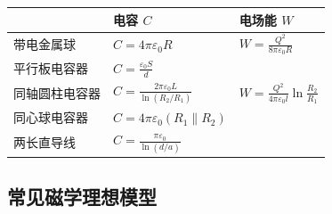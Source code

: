 \documentclass[UTF8,fontset=fandol,zihao=5]{ctexart}
\begin{document}
\begin{center}
\begin{tabularx}{0.96\textwidth}{>{\raggedright\arraybackslash}p{3.8cm}X X}
\toprule
 & 电容 \(C\) & 电场能 \(W\)\\
\midrule
带电金属球 & \(\displaystyle C=4\pi\varepsilon_0 R\) & \(\displaystyle W=\frac{Q^2}{8\pi\varepsilon_0R}\)\\
平行板电容器 & \(\displaystyle C=\frac{\varepsilon_0S}{d}\) & \\
同轴圆柱电容器 & \(\displaystyle C=\frac{2\pi\varepsilon_0L}{\ln(R_2/R_1)}\) & \(\displaystyle W=\frac{Q^2}{4\pi\varepsilon_0l}\ln\frac{R_2}{R_1}\)\\
同心球电容器 & \(C=4\pi\varepsilon_0(R_1\parallel R_2)\) & \\
两长直导线 & \(\displaystyle C=\frac{\pi\varepsilon_0}{\ln(d/a)}\) & \\
\bottomrule
\end{tabularx}
\end{center}


\subsection{常见磁学理想模型}
\end{document}
